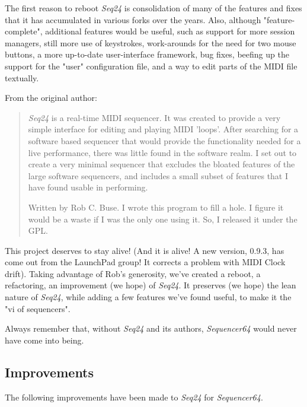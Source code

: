 \documentclass[
 11pt,
 twoside,
 a4paper,
 headinclude,
 footinclude,
 final                                 %
]{article}
\begin{document}
   The first reason to reboot \textsl{Seq24}
   is consolidation of many of the features and fixes that
   it has accumulated in various forks over the years.
   Also, although "feature-complete", additional features would be useful,
   such as support for more
   session managers, still more use of
   keystrokes, work-arounds for the need for two mouse buttons, a more
   up-to-date user-interface framework, bug fixes, beefing up the support
   for the "user" configuration file, and a way to edit parts of the MIDI file
   textually.

   From the original author:

   \begin{quotation}
      \textsl{Seq24} is a real-time MIDI sequencer. It was created to
      provide a very simple interface for editing and playing MIDI 'loops'.
      After searching for a software based sequencer that would provide the
      functionality needed for a live performance, there was little found in
      the software realm. I set out to create a very minimal sequencer that
      excludes the bloated features of the large software sequencers, and
      includes a small subset of features that I have found usable in
      performing. 

      Written by Rob C. Buse.  I wrote this program to fill a
      hole.  I figure it would be a waste if I was the only one
      using it.  So, I released it under the GPL.
   \end{quotation}

   This project deserves to stay alive!
   (And it is alive!  A new version, 0.9.3, has come out from the LaunchPad
   group!  It corrects a problem with MIDI Clock drift).
   Taking advantage of Rob's generosity,
   we've created a reboot, a refactoring, an improvement (we hope) of
   \textsl{Seq24}.  It preserves (we hope) the lean nature of \textsl{Seq24},
   while adding a few features we've found useful, to make it the
    "vi of sequencers".
   
   Always remember that, without \textsl{Seq24} and its authors,
   \textsl{Sequencer64} would never have come into being.

\subsection{Improvements}
\label{subsec:improvements}

   The following improvements have been made to \textsl{Seq24} for
   \textsl{Sequencer64}.
\end{document}

